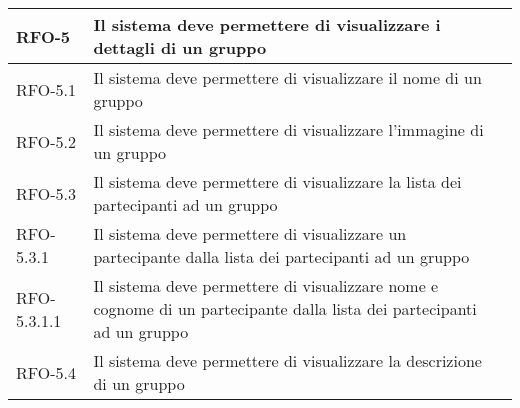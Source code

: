 \begin{center}
{\begin{longtable}{
      |>{\centering\arraybackslash}p{60pt}
      |>{\centering\arraybackslash}p{220pt}
      |>{\centering\arraybackslash}p{60pt}|}
      RFO-5                                                                & Il sistema deve permettere di visualizzare i dettagli di un
      gruppo                                                               & \nameref{uc:scenario-visualizzazione-dettaglio-gruppo}        \\
      \hline
      RFO-5.1                                                              & Il sistema deve permettere di visualizzare il nome di un
      gruppo                                                               & \nameref{sub:visualizzazione-nome-gruppo}                     \\
      \hline
      RFO-5.2                                                              & Il sistema deve permettere di visualizzare l'immagine di
      un gruppo                                                            & \nameref{sub:visualizzazione-immagine-gruppo}                 \\
      \hline

      RFO-5.3                                                              & Il sistema deve permettere di visualizzare la lista dei
      partecipanti ad un gruppo                                            & \nameref{sub:visualizzazione-utenti-gruppo}                   \\
      \hline

      RFO-5.3.1                                                            & Il sistema deve permettere di visualizzare un
      partecipante dalla lista dei partecipanti ad un gruppo               &
      \nameref{subsub:visualizzazione-partecipanti-gruppo}                                                                                 \\
      \hline

      RFO-5.3.1.1                                                          & Il sistema deve permettere di visualizzare nome e
      cognome di un partecipante dalla lista dei partecipanti ad un gruppo &
      \nameref{subsubsub:visualizzazione-singolo-partecipante-gruppo}                                                                      \\
      \hline

      RFO-5.4                                                              & Il sistema deve permettere di visualizzare la descrizione
      di un gruppo                                                         & \nameref{sub:visualizzazione-descrizione-gruppo}              \\
      \hline


\end{longtable}}
\end{center}
